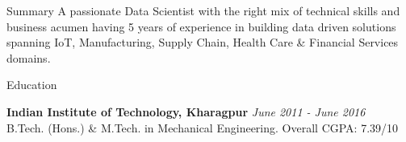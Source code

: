 \documentclass{resume}
\begin{document}
\begin{rSection}{Summary}
A passionate Data Scientist with the right mix of technical skills and business acumen having 5 years of experience in building data driven solutions spanning IoT, Manufacturing, Supply Chain, Health Care \& Financial Services domains.
\end{rSection}

\begin{rSection}{Education}

{\bf Indian Institute of Technology, Kharagpur} \hfill {\em June 2011 - June 2016} 
\\ B.Tech. (Hons.) \& M.Tech. in Mechanical Engineering.\hfill { Overall CGPA: 7.39/10}

\end{rSection}
\end{document}
